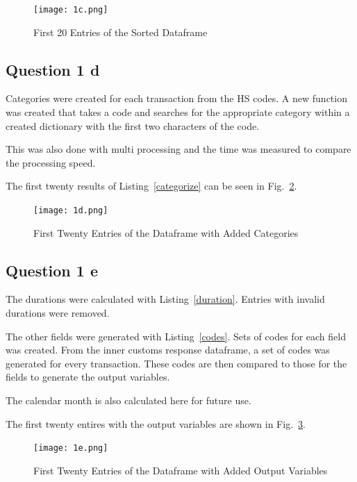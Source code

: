 \documentclass[a4paper,12pt]{article}
\numberwithin{equation}{section}
\numberwithin{figure}{section}
\numberwithin{table}{section}
\begin{document}
\begin{figure}[!htb]
    \centering
    \texttt{[image: 1c.png]}
    \caption{First 20 Entries of the Sorted Dataframe}
    \label{fig:1c}
\end{figure}
\FloatBarrier


\clearpage
\subsection{Question 1 d}

Categories were created for each transaction from the HS codes. A new function was created that takes a code and searches for the appropriate category within a created dictionary with the first two characters of the code. \par 
This was also done with multi processing and the time was measured to compare the processing speed. \par 
The first twenty results of Listing~\ref{categorize} can be seen in Fig.~\ref{fig:1d}.

\begin{figure}[!htb]
    \centering
    \texttt{[image: 1d.png]}
    \caption{First Twenty Entries of the Dataframe with Added Categories}
    \label{fig:1d}
\end{figure}
\FloatBarrier

\subsection{Question 1 e}

The durations were calculated with Listing~\ref{duration}. Entries with invalid durations were removed. \par 
The other fields were generated with Listing~\ref{codes}. Sets of codes for each field was created. From the inner customs response dataframe, a set of codes was generated for every transaction. These codes are then compared to those for the fields to generate the output variables. \par 
The calendar month is also calculated here for future use. \par
The first twenty entires with the output variables are shown in Fig.~\ref{fig:1e}.

\begin{figure}[!htb]
    \centering
    \texttt{[image: 1e.png]}
    \caption{First Twenty Entries of the Dataframe with Added Output Variables}
    \label{fig:1e}
\end{figure}
\FloatBarrier
\end{document}
